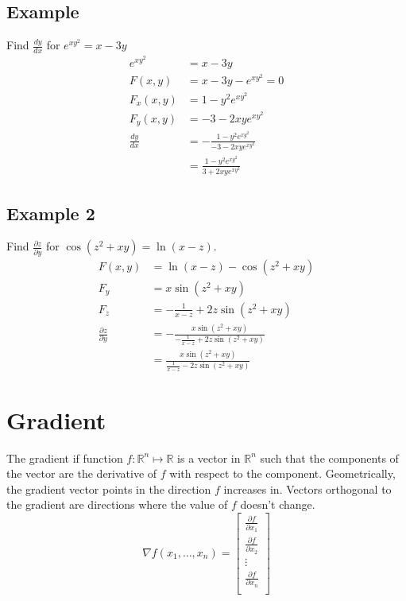 \documentclass{article}
\theoremstyle{mytheoremstyle}
\theoremstyle{mytheoremstyle}
\theoremstyle{myproblemstyle}
\begin{document}
    \subsection*{Example}
    Find $\frac{dy}{dx}$ for $e^{xy^2} = x-3y$
    \begin{align*}
        e^{xy^2} &= x-3y \\
        F(x,y) &= x-3y - e^{xy^2} = 0 \\
        F_x(x,y) &= 1 - y^2e^{xy^2} \\
        F_y(x,y) &= -3 - 2xye^{xy^2} \\
        \frac{dy}{dx} &= - \frac{1 - y^2e^{xy^2}}{-3 - 2xye^{xy^2}} \\
                      &= \frac{1 - y^2e^{xy^2}}{3 + 2xye^{xy^2}}
    \end{align*}

    \subsection*{Example 2}
    Find $\frac{\partial z}{\partial y}$ for $\cos(z^2+xy)=\ln(x-z)$.
    \begin{align*}
        F(x,y) &= \ln(x-z) - \cos(z^2+xy) \\
        F_y &= x \sin(z^2+xy) \\
        F_z &= -\frac{1}{x-z} + 2z\sin(z^2+xy) \\
        \frac{\partial z}{\partial y} &= - \frac{x \sin(z^2+xy)}{-\frac{1}{x-z} + 2z\sin(z^2+xy)} \\
                                      &= \frac{x \sin(z^2+xy)}{\frac{1}{x-z} - 2z\sin(z^2+xy)}
    \end{align*}

    \section*{Gradient}
    The gradient if function $f: \mathbb{R}^n \mapsto \mathbb{R}$ is a vector in
    $\mathbb{R}^n$ such that the components of the vector are the derivative of
    $f$ with respect to the component. Geometrically, the gradient vector points
    in the direction $f$ increases in. Vectors orthogonal to the gradient are
    directions where the value of $f$ doesn't change.
    \[
        \renewcommand{\arraystretch}{1.5}
        \nabla f(x_1,\dots,x_n) = \begin{bmatrix}
            \frac{\partial f}{\partial x_1} \\
            \frac{\partial f}{\partial x_2} \\
            \vdots \\
            \frac{\partial f}{\partial x_n} \\
        \end{bmatrix}
    \]
\end{document}
